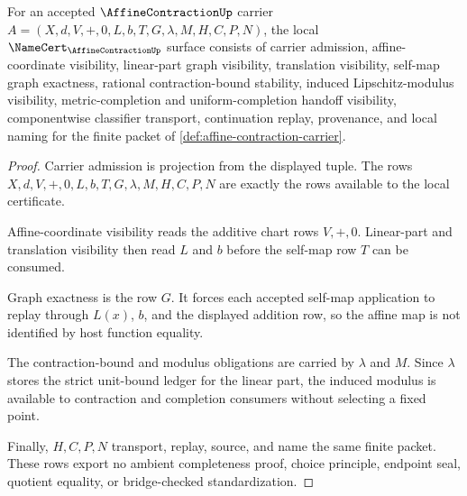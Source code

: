 \begin{theorem}
\label{thm:affine-contraction-namecert-obligations}
For an accepted $\AffineContractionUp$ carrier $A=(X,d,V,+,0,L,b,T,G,\lambda,M,H,C,P,N)$, the local $\NameCert_{\AffineContractionUp}$ surface consists of carrier admission, affine-coordinate visibility, linear-part graph visibility, translation visibility, self-map graph exactness, rational contraction-bound stability, induced Lipschitz-modulus visibility, metric-completion and uniform-completion handoff visibility, componentwise classifier transport, continuation replay, provenance, and local naming for the finite packet of \autoref{def:affine-contraction-carrier}.
\end{theorem}
\begin{proof}
Carrier admission is projection from the displayed tuple. The rows $X,d,V,+,0,L,b,T,G,\lambda,M,H,C,P,N$ are exactly the rows available to the local certificate.

Affine-coordinate visibility reads the additive chart rows $V,+,0$. Linear-part and translation visibility then read $L$ and $b$ before the self-map row $T$ can be consumed.

Graph exactness is the row $G$. It forces each accepted self-map application to replay through $L(x)$, $b$, and the displayed addition row, so the affine map is not identified by host function equality.

The contraction-bound and modulus obligations are carried by $\lambda$ and $M$. Since $\lambda$ stores the strict unit-bound ledger for the linear part, the induced modulus is available to contraction and completion consumers without selecting a fixed point.

Finally, $H,C,P,N$ transport, replay, source, and name the same finite packet. These rows export no ambient completeness proof, choice principle, endpoint seal, quotient equality, or bridge-checked standardization.
\end{proof}

